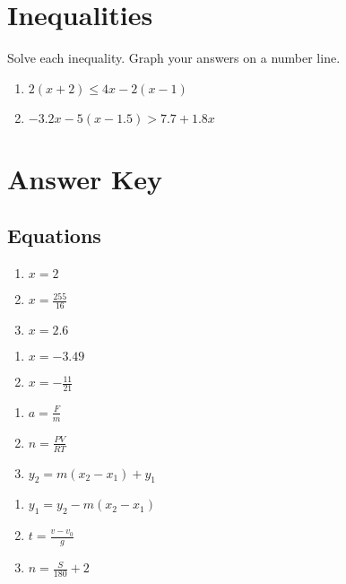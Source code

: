 \section*{Inequalities}

Solve each inequality. Graph your answers on a number line.

\begin{multicols}{3}
\begin{enumerate}
	\item $2(x+2) \leq 4x - 2(x-1)$
	\item $-3.2x - 5(x - 1.5) > 7.7 + 1.8x$
\end{enumerate}
\end{multicols}

\newpage

\section{Answer Key}

\subsection*{Equations}

\begin{multicols}{3}
\begin{enumerate}
	\item $x = 2$
	\item $x = \frac{255}{16}$
	\item $x = 2.6$
\end{enumerate}	\setcounter{Review}{\value{enumi}}
\end{multicols}
\begin{multicols}{3}
\begin{enumerate}	\setcounter{enumi}{\value{Review}}
	\item $x = -3.49$
	\item $x = -\frac{11}{21}$
\end{enumerate}	\setcounter{Review}{\value{enumi}}
\end{multicols}

\begin{multicols}{3}
\begin{enumerate}	\setcounter{enumi}{\value{Review}}
	\item $a = \frac{F}{m}$
	\item $n = \frac{PV}{RT}$
	\item $y_2 = m(x_2-x_1)+y_1$
\end{enumerate}	\setcounter{Review}{\value{enumi}}
\end{multicols}
\begin{multicols}{3}
\begin{enumerate}	\setcounter{enumi}{\value{Review}}
	\item $y_1 = y_2-m(x_2-x_1)$
    \item $t = \frac{v-v_0}{g}$
    \item $n = \frac{S}{180} + 2$
\end{enumerate}	\setcounter{Review}{\value{enumi}}
\end{multicols}


